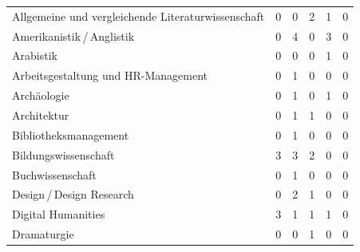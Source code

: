 \documentclass{scrartcl}
\begin{document}
\begin{landscape}
\begin{longtable}{L{7.5cm}ccccc}
      Allgemeine und vergleichende Literaturwissenschaft      & 0                     &  0                       &  2                       & 1                    & 0                       \\
      Amerikanistik\,/\,Anglistik                             & 0                     &  4                       &  0                       & 3                    & 0                       \\
      Arabistik                                               & 0                     &  0                       &  0                       & 1                    & 0                       \\
      Arbeitsgestaltung und HR-Management                     & 0                     &  1                       &  0                       & 0                    & 0                       \\
      Archäologie                                             & 0                     &  1                       &  0                       & 1                    & 0                       \\
      Architektur                                             & 0                     &  1                       &  1                       & 0                    & 0                       \\
      Bibliotheksmanagement                                   & 0                     &  1                       &  0                       & 0                    & 0                       \\
      Bildungswissenschaft                                    & 3                     &  3                       &  2                       & 0                    & 0                       \\
      Buchwissenschaft                                        & 0                     &  1                       &  0                       & 0                    & 0                       \\
      Design\,/\,Design Research                              & 0                     &  2                       &  1                       & 0                    & 0                       \\
      Digital Humanities                                      & 3                     &  1                       &  1                       & 1                    & 0                       \\
      Dramaturgie                                             & 0                     &  0                       &  1                       & 0                    & 0                       \\

\end{longtable}
\end{landscape}
\end{document}
